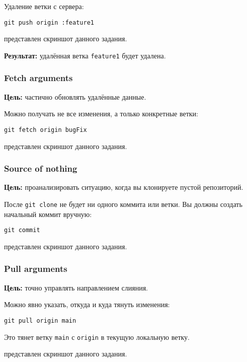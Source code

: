 \documentclass[a4paper,12pt]{report}
\begin{document}
Удаление ветки с сервера:
\begin{verbatim}
git push origin :feature1
\end{verbatim}

 представлен скриншот данного задания.

\textbf{Результат:} удалённая ветка \texttt{feature1} будет удалена.

\subsubsection{Fetch arguments}
\textbf{Цель:} частично обновлять удалённые данные.

Можно получать не все изменения, а только конкретные ветки:
\begin{verbatim}
git fetch origin bugFix
\end{verbatim}

 представлен скриншот данного задания.

\subsubsection{Source of nothing}
\textbf{Цель:} проанализировать ситуацию, когда вы клонируете пустой репозиторий.

После \texttt{git clone} не будет ни одного коммита или ветки. Вы должны создать начальный коммит вручную:
\begin{verbatim}
git commit
\end{verbatim}

 представлен скриншот данного задания.

\subsubsection{Pull arguments}
\textbf{Цель:} точно управлять направлением слияния.

Можно явно указать, откуда и куда тянуть изменения:
\begin{verbatim}
git pull origin main
\end{verbatim}

Это тянет ветку \texttt{main} с \texttt{origin} в текущую локальную ветку.

 представлен скриншот данного задания.
\end{document}
